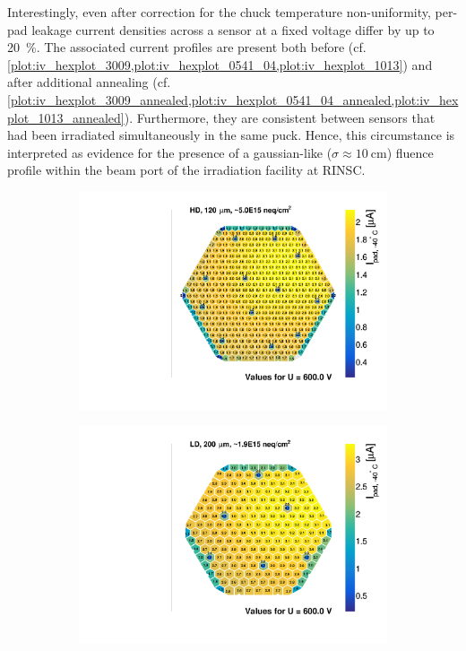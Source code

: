 Interestingly, even after correction for the chuck temperature non-uniformity, per-pad leakage current densities across a sensor at a fixed voltage differ by up to \SI{20}{\percent}.
The associated current profiles are present both before (cf. \ref{plot:iv_hexplot_3009,plot:iv_hexplot_0541_04,plot:iv_hexplot_1013}) and after additional annealing (cf. \ref{plot:iv_hexplot_3009_annealed,plot:iv_hexplot_0541_04_annealed,plot:iv_hexplot_1013_annealed}).
Furthermore, they are consistent between sensors that had been irradiated simultaneously in the same puck.
Hence, this circumstance is interpreted as evidence for the presence of a gaussian-like ($\sigma\approx\SI{10}{\centi\metre}$) fluence profile within the beam port of the irradiation facility at RINSC.
\begin{figure}
	\captionsetup[subfigure]{aboveskip=-1pt,belowskip=-1pt}
	\centering
	\begin{subfigure}[b]{0.32\textwidth}
		\includegraphics[width=0.999\textwidth]{plots/iv_hexplots/3009.pdf}
		\subcaption{
		}
		\label{plot:iv_hexplot_3009}
	\end{subfigure}
	\hfill
	\begin{subfigure}[b]{0.32\textwidth}
		\includegraphics[width=0.999\textwidth]{plots/iv_hexplots/0541_04.pdf}

\end{subfigure}
\end{figure}
